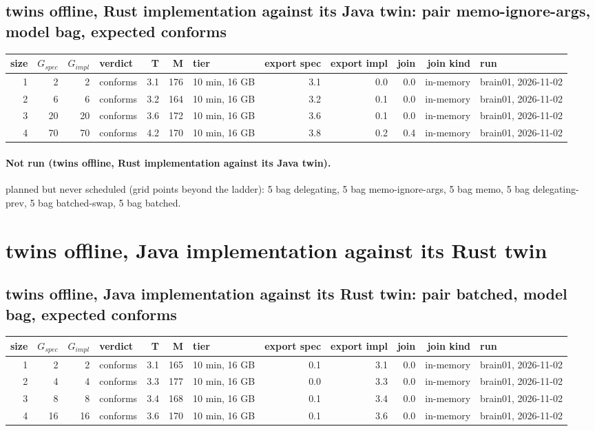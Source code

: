 \documentclass[10pt]{article}
\begin{document}
\subsection*{twins offline, Rust implementation against its Java twin: pair \textsf{memo-ignore-args}, model bag, expected conforms}
\begin{longtable}{@{}rrrlrrlrrrrl@{}}
\toprule
size & $G_{\mathit{spec}}$ & $G_{\mathit{impl}}$ & verdict & T & M & tier & export spec & export impl & join & join kind & run \\
\midrule
\endhead
\color{red} 1 & 2 & 2 & conforms & 3.1 & 176 & 10 min, 16 GB & 3.1 & 0.0 & 0.0 & in-memory & brain01, 2026-11-02 \\
\color{red} 2 & 6 & 6 & conforms & 3.2 & 164 & 10 min, 16 GB & 3.2 & 0.1 & 0.0 & in-memory & brain01, 2026-11-02 \\
\color{red} 3 & 20 & 20 & conforms & 3.6 & 172 & 10 min, 16 GB & 3.6 & 0.1 & 0.0 & in-memory & brain01, 2026-11-02 \\
\color{red} 4 & 70 & 70 & conforms & 4.2 & 170 & 10 min, 16 GB & 3.8 & 0.2 & 0.4 & in-memory & brain01, 2026-11-02 \\
\bottomrule
\end{longtable}
\paragraph{Not run (twins offline, Rust implementation against its Java twin).}
planned but never scheduled (grid points beyond the ladder): 5 bag delegating, 5 bag memo-ignore-args, 5 bag memo, 5 bag delegating-prev, 5 bag batched-swap, 5 bag batched.\par
\section*{twins offline, Java implementation against its Rust twin}
\subsection*{twins offline, Java implementation against its Rust twin: pair \textsf{batched}, model bag, expected conforms}
\begin{longtable}{@{}rrrlrrlrrrrl@{}}
\toprule
size & $G_{\mathit{spec}}$ & $G_{\mathit{impl}}$ & verdict & T & M & tier & export spec & export impl & join & join kind & run \\
\midrule
\endhead
\color{red} 1 & 2 & 2 & conforms & 3.1 & 165 & 10 min, 16 GB & 0.1 & 3.1 & 0.0 & in-memory & brain01, 2026-11-02 \\
\color{red} 2 & 4 & 4 & conforms & 3.3 & 177 & 10 min, 16 GB & 0.0 & 3.3 & 0.0 & in-memory & brain01, 2026-11-02 \\
\color{red} 3 & 8 & 8 & conforms & 3.4 & 168 & 10 min, 16 GB & 0.1 & 3.4 & 0.0 & in-memory & brain01, 2026-11-02 \\
\color{red} 4 & 16 & 16 & conforms & 3.6 & 170 & 10 min, 16 GB & 0.1 & 3.6 & 0.0 & in-memory & brain01, 2026-11-02 \\
\bottomrule
\end{longtable}
\end{document}
